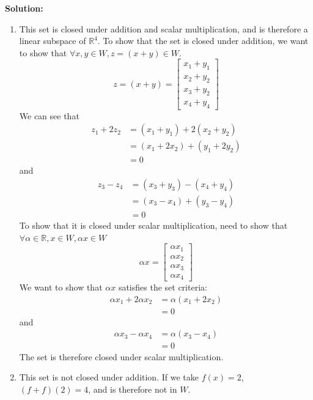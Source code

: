 \documentclass[]{article}
\newcommand{\R}{\mathbb{R}}
\newcommand{\bbm}{\begin{bmatrix}}
\newcommand{\ebm}{\end{bmatrix}}
\newcommand{\solution}{\vskip 0.5cm \textbf{\large Solution:} \\}
\begin{document}
\begin{enumerate}[resume]
	  \solution

	  \begin{enumerate}
	  \item This set is closed under addition and scalar multiplication,
        and is therefore a linear subspace of $\R^4$. To show that the
        set is closed under addition, we want to show that $\forall x,y
        \in W, z = (x + y) \in W$.
        \[
        z = (x + y) = \bbm x_1 + y_1 \\ x_2 + y_2 \\ x_3 + y_2 \\ x_4 + y_4 \ebm
        \]
        We can see that
        \[\begin{split}
        z_1 + 2z_2 &= (x_1 + y_1) + 2(x_2 + y_2) \\
        &= (x_1 + 2x_2) + (y_1 + 2y_2) \\
        &= 0
        \end{split}\]
        and
        \[\begin{split}
        z_3 - z_4 &= (x_3 + y_3) - (x_4 + y_4) \\
        &= (x_3 - x_4) + (y_3 - y_4) \\
        &= 0
        \end{split}\]
        To show that it is closed under scalar multiplication, need to
        show that $\forall \alpha \in \R, x \in W, \alpha x \in W$
        \[
        \alpha x = \bbm \alpha x_1 \\ \alpha x_2 \\ \alpha x_3 \\ \alpha x_4 \ebm
        \]
        We want to show that $\alpha x$ satisfies the set criteria:
        \[\begin{split}
        \alpha x_1 + 2 \alpha x_2 &= \alpha (x_1 + 2 x_2) \\
        &= 0
        \end{split}\]
        and
        \[\begin{split}
        \alpha x_3 - \alpha x_4 &= \alpha (x_3 - x_4) \\
        &= 0
        \end{split}\]
        The set is therefore closed under scalar multiplication.
        
	  \item This set is not closed under addition. If we take $f(x) = 2$, $(f + f)(2) = 4$, and is therefore not in $W$.
        

\end{enumerate}
\end{enumerate}
\end{document}
